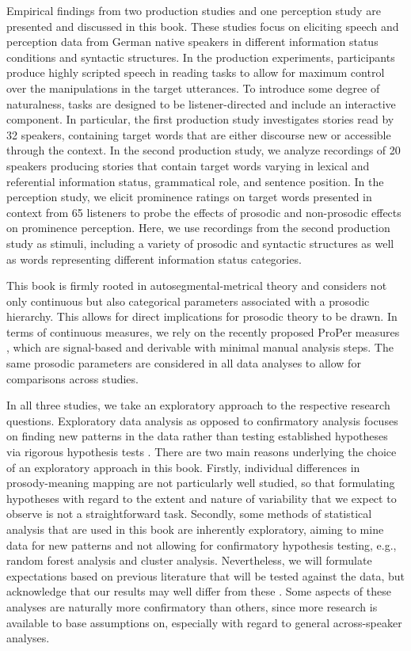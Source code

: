 Empirical findings from two production studies and one perception study are presented and discussed in this book. These studies focus on eliciting speech and perception data from German native speakers in different information status conditions and syntactic structures. In the production experiments, participants produce highly scripted speech in reading tasks to allow for maximum control over the manipulations in the target utterances. To introduce some degree of naturalness, tasks are designed to be listener-directed and include an interactive component. In particular, the first production study investigates stories read by 32 speakers, containing target words that are either discourse new or accessible through the context. In the second production study, we analyze recordings of 20 speakers producing stories that contain target words varying in lexical and referential information status, grammatical role, and sentence position. In the perception study, we elicit prominence ratings on target words presented in context from 65 listeners to probe the effects of prosodic and non-prosodic effects on prominence perception. Here, we use recordings from the second production study as stimuli, including a variety of prosodic and syntactic structures as well as words representing different information status categories.

This book is firmly rooted in autosegmental-metrical theory \citep{laddIntonationalPhonology2008} and considers not only continuous but also categorical parameters associated with a prosodic hierarchy. This allows for direct implications for prosodic theory to be drawn. In terms of continuous measures, we rely on the recently proposed ProPer measures \citep{albertModelSonorityBased2023}, which are signal-based and derivable with minimal manual analysis steps. The same prosodic parameters are considered in all data analyses to allow for comparisons across studies.

In all three studies, we take an exploratory approach to the respective research questions. Exploratory data analysis as opposed to confirmatory analysis focuses on finding new patterns in the data rather than testing established hypotheses via rigorous hypothesis tests \citep{roettgerEmergentDataAnalysis2019}. There are two main reasons underlying the choice of an exploratory approach in this book. Firstly, individual differences in prosody-meaning mapping are not particularly well studied, so that formulating hypotheses with regard to the extent and nature of variability that we expect to observe is not a straightforward task. Secondly, some methods of statistical analysis that are used in this book are inherently exploratory, aiming to mine data for new patterns and not allowing for confirmatory hypothesis testing, e.g., random forest analysis and cluster analysis. Nevertheless, we will formulate expectations based on previous literature that will be tested against the data, but acknowledge that our results may well differ from these \citep{rubinExploratoryHypothesisTests2022}. Some aspects of these analyses are naturally more confirmatory than others, since more research is available to base assumptions on, especially with regard to general across-speaker analyses.

